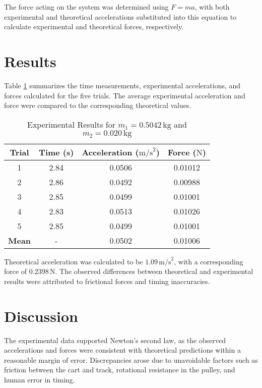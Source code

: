 \documentclass[12pt,twocolumn]{article}
\begin{document}
The force acting on the system was determined using \( F = ma \), with both experimental and theoretical accelerations substituted into this equation to calculate experimental and theoretical forces, respectively.

\section*{Results}
Table \ref{table:results} summarizes the time measurements, experimental accelerations, and forces calculated for the five trials. The average experimental acceleration and force were compared to the corresponding theoretical values.

\begin{table}[H]
\centering
\caption{Experimental Results for \( m_1 = 0.5042 \, \text{kg} \) and \( m_2 = 0.020 \, \text{kg} \)}
\label{table:results}
\begin{tabular}{@{}cccc@{}}
\toprule
\textbf{Trial} & \textbf{Time (s)} & \textbf{Acceleration (\( \text{m/s}^2 \))} & \textbf{Force (\( \text{N} \))} \\ \midrule
1              & 2.84              & 0.0506                                   & 0.01012                        \\
2              & 2.86              & 0.0492                                   & 0.00988                        \\
3              & 2.85              & 0.0499                                   & 0.01001                        \\
4              & 2.83              & 0.0513                                   & 0.01026                        \\
5              & 2.85              & 0.0499                                   & 0.01001                        \\ \midrule
\textbf{Mean}  & -                 & 0.0502                                   & 0.01006                        \\ \bottomrule
\end{tabular}
\end{table}

Theoretical acceleration was calculated to be \( 1.09 \, \text{m/s}^2 \), with a corresponding force of \( 0.2398 \, \text{N} \). The observed differences between theoretical and experimental results were attributed to frictional forces and timing inaccuracies.

\section*{Discussion}
The experimental data supported Newton’s second law, as the observed accelerations and forces were consistent with theoretical predictions within a reasonable margin of error. Discrepancies arose due to unavoidable factors such as friction between the cart and track, rotational resistance in the pulley, and human error in timing. 
\end{document}
